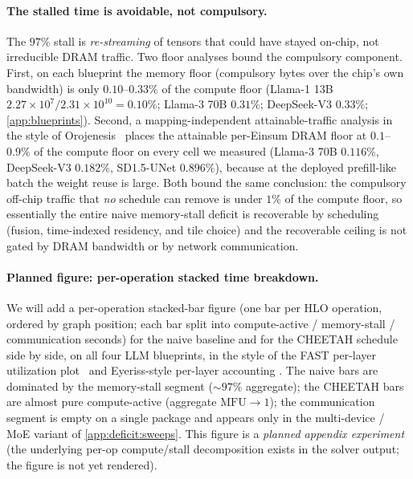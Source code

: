 \paragraph{The stalled time is avoidable, not compulsory.}
The $97\%$ stall is \emph{re-streaming} of tensors that could have stayed
on-chip, not irreducible DRAM traffic. Two floor analyses bound the compulsory
component. First, on each blueprint the memory floor (compulsory bytes over the
chip's own bandwidth) is only $0.10$--$0.33\%$ of the compute floor
(Llama-1 13B $2.27\times10^{7}/2.31\times10^{10}=0.10\%$; Llama-3 70B $0.31\%$;
DeepSeek-V3 $0.33\%$; \cref{app:blueprints}). Second, a mapping-independent
attainable-traffic analysis in the style of Orojenesis~\citep{huang2024mindthegap}
places the attainable per-Einsum DRAM floor at $\mathbf{0.1}$--$\mathbf{0.9\%}$
of the compute floor on every cell we measured (Llama-3 70B $0.116\%$,
DeepSeek-V3 $0.182\%$, SD1.5-UNet $0.896\%$), because at the deployed
prefill-like batch the weight reuse is large. Both bound the same conclusion:
the compulsory off-chip traffic that \emph{no} schedule can remove is under
$1\%$ of the compute floor, so essentially the entire naive memory-stall
deficit is recoverable by scheduling (fusion, time-indexed residency, and
tile choice) and the recoverable ceiling is not gated by DRAM bandwidth or
by network communication.

\paragraph{Planned figure: per-operation stacked time breakdown.}
We will add a per-operation stacked-bar figure (one bar per HLO operation,
ordered by graph position; each bar split into compute-active / memory-stall /
communication seconds) for the naive baseline and for the CHEETAH schedule side
by side, on all four LLM blueprints, in the style of the FAST per-layer
utilization plot~\citep{zhang_fast} and Eyeriss-style per-layer accounting
\citep{chen2019eyerissv2flexibleaccelerator}. The naive bars are dominated by
the memory-stall segment ($\sim97\%$ aggregate); the CHEETAH bars are almost
pure compute-active (aggregate $\mathrm{MFU}\to1$); the communication segment is
empty on a single package and appears only in the multi-device / MoE variant of
\cref{app:deficit:sweeps}. This figure is a \emph{planned appendix experiment}
(the underlying per-op compute/stall decomposition exists in the solver output;
the figure is not yet rendered).


